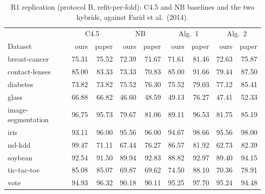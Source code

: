 \begin{table}[t]
\caption{R1 replication (protocol B, refit-per-fold): C4.5 and NB baselines and the two hybrids, against Farid et al.\ (2014).}
\label{tab:r1}
\centering\small
\begin{tabular}{lrrrrrrrr}
\toprule
& \multicolumn{2}{c}{C4.5} & \multicolumn{2}{c}{NB} & \multicolumn{2}{c}{Alg.\ 1} & \multicolumn{2}{c}{Alg.\ 2} \\
Dataset & ours & paper & ours & paper & ours & paper & ours & paper \\
\midrule
breast-cancer & 75.31 & 75.52 & 72.39 & 71.67 & 71.61 & 81.46 & 72.63 & 75.87 \\
contact-lenses & 85.00 & 83.33 & 73.33 & 70.83 & 85.00 & 91.66 & 79.44 & 87.50 \\
diabetes & 73.82 & 73.82 & 75.52 & 76.30 & 75.52 & 79.03 & 77.12 & 85.41 \\
glass & 66.88 & 66.82 & 46.60 & 48.59 & 49.13 & 76.27 & 47.41 & 52.33 \\
image-segmentation & 96.75 & 95.73 & 79.67 & 81.06 & 89.11 & 96.53 & 81.75 & 85.19 \\
iris & 93.11 & 96.00 & 95.56 & 96.00 & 94.67 & 98.66 & 95.56 & 98.00 \\
nsl-kdd & 99.47 & 71.11 & 67.44 & 76.27 & 86.57 & 81.92 & 62.73 & 82.39 \\
soybean & 92.54 & 91.50 & 89.94 & 92.83 & 88.82 & 92.97 & 89.40 & 94.15 \\
tic-tac-toe & 85.08 & 85.07 & 69.87 & 69.62 & 74.50 & 88.10 & 70.36 & 78.91 \\
vote & 94.93 & 96.32 & 90.18 & 90.11 & 95.25 & 97.70 & 95.24 & 94.48 \\
\bottomrule
\end{tabular}
\end{table}
